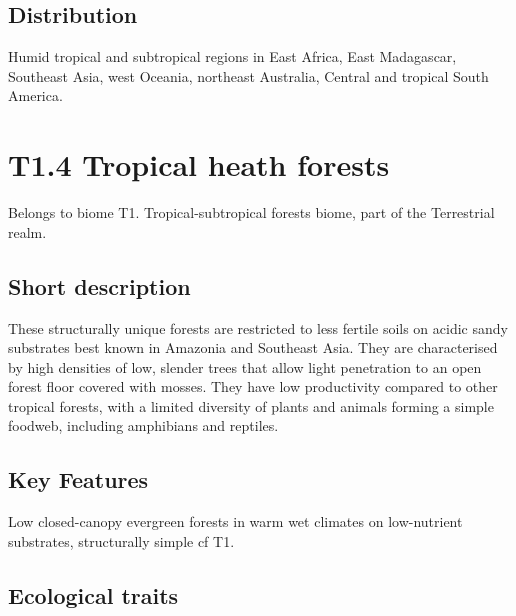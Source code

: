 \documentclass[
  letterpaper,
  DIV=11,
  numbers=noendperiod]{scrartcl}
\begin{document}
\subsection{Distribution}\label{distribution-71}

Humid tropical and subtropical regions in East Africa, East Madagascar,
Southeast Asia, west Oceania, northeast Australia, Central and tropical
South America.

\section{T1.4 Tropical heath forests}\label{t1.4-tropical-heath-forests}

Belongs to biome T1. Tropical-subtropical forests biome, part of the
Terrestrial realm.

\subsection{Short description}\label{short-description-72}

These structurally unique forests are restricted to less fertile soils
on acidic sandy substrates best known in Amazonia and Southeast Asia.
They are characterised by high densities of low, slender trees that
allow light penetration to an open forest floor covered with mosses.
They have low productivity compared to other tropical forests, with a
limited diversity of plants and animals forming a simple foodweb,
including amphibians and reptiles.

\subsection{Key Features}\label{key-features-72}

Low closed-canopy evergreen forests in warm wet climates on low-nutrient
substrates, structurally simple cf T1.

\subsection{Ecological traits}\label{ecological-traits-72}
\end{document}
